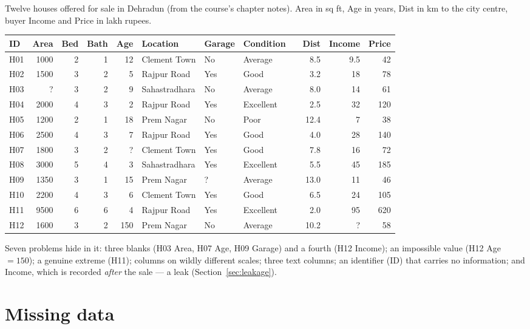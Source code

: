 \documentclass[11pt]{article}
\begin{document}
\begin{keyidea}
Twelve houses offered for sale in Dehradun (from the course's chapter notes).
Area in sq ft, Age in years, Dist in km to the city centre, buyer Income and
Price in lakh rupees.
\begin{center}
\scriptsize
\setlength{\tabcolsep}{3.5pt}
\begin{tabular}{@{}lrrrrllllrrr@{}}
\toprule
ID & Area & Bed & Bath & Age & Location & Garage & Condition & & Dist & Income & Price\\ \midrule
H01 & 1000 & 2 & 1 & 12 & Clement Town & No & Average & & 8.5 & 9.5 & 42\\
H02 & 1500 & 3 & 2 & 5 & Rajpur Road & Yes & Good & & 3.2 & 18 & 78\\
H03 & ? & 3 & 2 & 9 & Sahastradhara & No & Average & & 8.0 & 14 & 61\\
H04 & 2000 & 4 & 3 & 2 & Rajpur Road & Yes & Excellent & & 2.5 & 32 & 120\\
H05 & 1200 & 2 & 1 & 18 & Prem Nagar & No & Poor & & 12.4 & 7 & 38\\
H06 & 2500 & 4 & 3 & 7 & Rajpur Road & Yes & Good & & 4.0 & 28 & 140\\
H07 & 1800 & 3 & 2 & ? & Clement Town & Yes & Good & & 7.8 & 16 & 72\\
H08 & 3000 & 5 & 4 & 3 & Sahastradhara & Yes & Excellent & & 5.5 & 45 & 185\\
H09 & 1350 & 3 & 1 & 15 & Prem Nagar & ? & Average & & 13.0 & 11 & 46\\
H10 & 2200 & 4 & 3 & 6 & Clement Town & Yes & Good & & 6.5 & 24 & 105\\
H11 & 9500 & 6 & 6 & 4 & Rajpur Road & Yes & Excellent & & 2.0 & 95 & 620\\
H12 & 1600 & 3 & 2 & 150 & Prem Nagar & No & Average & & 10.2 & ? & 58\\
\bottomrule
\end{tabular}
\end{center}
Seven problems hide in it: three blanks (H03 Area, H07 Age, H09 Garage) and a
fourth (H12 Income); an impossible value (H12 Age $= 150$); a genuine extreme
(H11); columns on wildly different scales; three text columns; an identifier
(ID) that carries no information; and Income, which is recorded \emph{after}
the sale --- a leak (Section~\ref{sec:leakage}).
\end{keyidea}

\section{Missing data}
\label{sec:missing}
\end{document}

